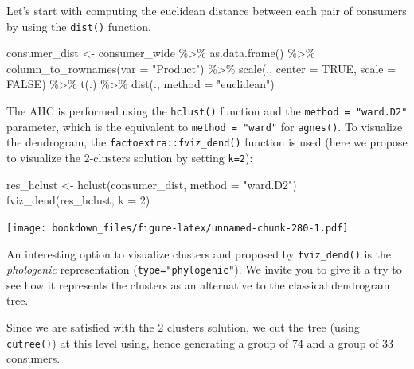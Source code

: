 \documentclass[
]{krantz}
\makeatletter
\newenvironment{Shaded}{\begin{snugshade}}{\end{snugshade}}
\newcommand{\AttributeTok}[1]{\textcolor[rgb]{0.61,0.61,0.61}{#1}}
\newcommand{\ConstantTok}[1]{\textcolor[rgb]{0,0,0}{#1}}
\newcommand{\DecValTok}[1]{\textcolor[rgb]{0.06,0.06,0.06}{#1}}
\newcommand{\FunctionTok}[1]{\textcolor[rgb]{0,0,0}{#1}}
\newcommand{\NormalTok}[1]{#1}
\newcommand{\OtherTok}[1]{\textcolor[rgb]{0.37,0.37,0.37}{#1}}
\newcommand{\SpecialCharTok}[1]{\textcolor[rgb]{0,0,0}{#1}}
\newcommand{\StringTok}[1]{\textcolor[rgb]{0.5,0.5,0.5}{#1}}
\renewenvironment{quote}{\begin{VF}}{\end{VF}}
\newenvironment{kframe}{%
\medskip{}
\setlength{\fboxsep}{.8em}
 \def\at@end@of@kframe{}%
 \ifinner\ifhmode%
  \def\at@end@of@kframe{\end{minipage}}%
  \begin{minipage}{\columnwidth}%
 \fi\fi%
 \def\FrameCommand##1{\hskip\@totalleftmargin \hskip-\fboxsep
 \colorbox{shadecolor}{##1}\hskip-\fboxsep
     \hskip-\linewidth \hskip-\@totalleftmargin \hskip\columnwidth}%
 \MakeFramed {\advance\hsize-\width
   \@totalleftmargin\z@ \linewidth\hsize
   \@setminipage}}%
 {\par\unskip\endMakeFramed%
 \at@end@of@kframe}
\renewenvironment{Shaded}{\begin{kframe}}{\end{kframe}}
\makeatother
\begin{document}
Let's start with computing the euclidean distance between each pair of consumers by using the \texttt{dist()} function.

\begin{Shaded}
\begin{Highlighting}[]
\NormalTok{consumer\_dist }\OtherTok{\textless{}{-}}\NormalTok{ consumer\_wide }\SpecialCharTok{\%\textgreater{}\%}
  \FunctionTok{as.data.frame}\NormalTok{() }\SpecialCharTok{\%\textgreater{}\%}
  \FunctionTok{column\_to\_rownames}\NormalTok{(}\AttributeTok{var =} \StringTok{"Product"}\NormalTok{) }\SpecialCharTok{\%\textgreater{}\%}
  \FunctionTok{scale}\NormalTok{(., }\AttributeTok{center =} \ConstantTok{TRUE}\NormalTok{, }\AttributeTok{scale =} \ConstantTok{FALSE}\NormalTok{) }\SpecialCharTok{\%\textgreater{}\%}
  \FunctionTok{t}\NormalTok{(.) }\SpecialCharTok{\%\textgreater{}\%}
  \FunctionTok{dist}\NormalTok{(., }\AttributeTok{method =} \StringTok{"euclidean"}\NormalTok{)}
\end{Highlighting}
\end{Shaded}

The AHC is performed using the \texttt{hclust()} function and the \texttt{method\ =\ "ward.D2"} parameter, which is the equivalent to \texttt{method\ =\ "ward"} for \texttt{agnes()}. To visualize the dendrogram, the \texttt{factoextra::fviz\_dend()} function is used (here we propose to visualize the 2-clusters solution by setting \texttt{k=2}):

\begin{Shaded}
\begin{Highlighting}[]
\NormalTok{res\_hclust }\OtherTok{\textless{}{-}} \FunctionTok{hclust}\NormalTok{(consumer\_dist, }\AttributeTok{method =} \StringTok{"ward.D2"}\NormalTok{)}
\FunctionTok{fviz\_dend}\NormalTok{(res\_hclust, }\AttributeTok{k =} \DecValTok{2}\NormalTok{)}
\end{Highlighting}
\end{Shaded}

\texttt{[image: bookdown\_files/figure-latex/unnamed-chunk-280-1.pdf]}

\begin{quote}
An interesting option to visualize clusters and proposed by \texttt{fviz\_dend()} is the \emph{phologenic} representation (\texttt{type="phylogenic"}). We invite you to give it a try to see how it represents the clusters as an alternative to the classical dendrogram tree.
\end{quote}

Since we are satisfied with the 2 clusters solution, we cut the tree (using \texttt{cutree()}) at this level using, hence generating a group of 74 and a group of 33 consumers.
\end{document}
